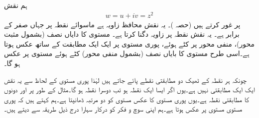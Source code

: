 ہم نقش 
\begin{align}
w=u+iv=z^2
\end{align}
پر غور کرتے ہیں (حصہ )۔ یہ نقش محافظ زاویہ ہے ماسوائے نقطہ  پر جہاں  صفر کے برابر ہے۔ یہ نقش نقطہ  پر  زاویہ دگنا کرتا ہے۔ مستوی کا دایاں نصف (بشمول مثبت  محور)، منفی  محور پر کٹے ہوئے،  پوری   مستوی پر ایک ایک مطابقت کے ساتھ عکس ہوتا ہے۔اسی طرح  مستوی کا بایاں نصف (بشمول منفی  محور) کٹے ہوئے  مستوی پر عکس ہو گا۔

چونکہ ہر  نقطہ کے ٹھیک دو مطابقتی  نقطے پائے جاتے ہیں لہٰذا  پوری  مستوی کے لحاظ سے یہ نقش ایک ایک مطابقتی نہیں ہے۔یوں اگر  ایسا ایک  نقطہ  ہو تب دوسرا نقطہ  ہو گا۔مثال کے طور پر  اور  دونوں کا مطابقتی نقطہ  ہے۔یوں پوری  مستوی کا عکس  مستوی کو دو مرتبہ ڈھانپتا ہے۔ہم کہتے ہیں کہ پوری  مستوی   مستوی پر عکس ہوتا ہے۔ہم اپنی سوچ و فکر کو درکار سہارا درج ذیل طریقہ سے دیتے ہیں۔

